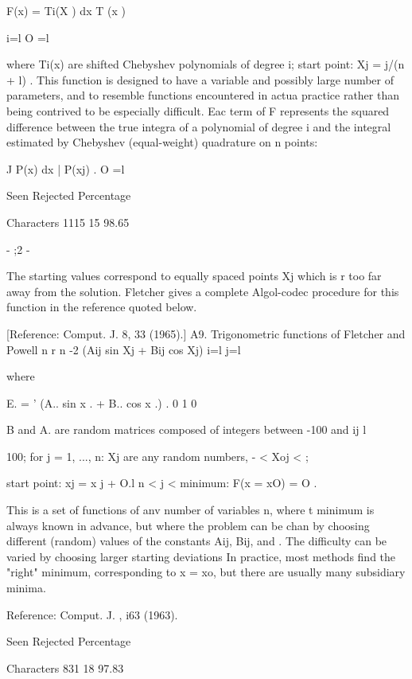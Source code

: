  
 
               F(x) =    Ti(X ) dx          T (x )
 
                      i=l O              =l
 
 
where Ti(x) are shifted Chebyshev polynomials of degree i;
start point:                 Xj = j/(n + l) .
     This function is designed to have a variable and possibly large
number of parameters, and to resemble functions encountered in actua
practice rather than being contrived to be especially difficult.  Eac
term of F represents the squared difference between the true integra
of a polynomial of degree i and the integral estimated by Chebyshev
(equal-weight) quadrature on n points:
 
 
                      J P(x) dx | P(xj) .
                    O                                   =l
 
                 Seen Rejected  Percentage
 
Characters       1115       15   98.65
 
                                - ;2 -
 
 
The starting values correspond to equally spaced points Xj which is r
too far away from the solution.  Fletcher gives a complete Algol-codec
procedure for this function in the reference quoted below.
 
[Reference:  Comput. J. 8, 33 (1965).]
A9.  Trigonometric functions of Fletcher and Powell
                    n r n                                 -2
                                  (Aij sin Xj + Bij cos Xj)
                i=l  j=l
 
where
 
 
                  E. = '  (A.. sin x . + B.. cos x .) .
                               0 1     0
 
 
 
B   and A.  are random matrices composed of integers between -100 and
 ij      l
 
100;  for j = 1, ..., n:  Xj are any random numbers, - < Xoj < ;
 
start point:         xj = x j + O.l     n < j <
minimum:             F(x = xO) = O .
 
     This is a set of functions of anv number of variables n, where t
minimum is always known in advance, but where the problem can be chan
by choosing different (random) values of the constants Aij, Bij, and .
The difficulty can be varied by choosing larger starting deviations
In practice, most methods find the "right" minimum, corresponding to
x = xo, but there are usually many subsidiary minima.
 
Reference:  Comput. J. , i63 (1963).
 
                 Seen Rejected  Percentage
 
Characters        831       18   97.83
